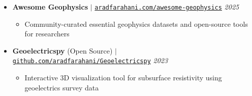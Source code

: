 \documentclass[letterpaper,11pt]{article}
\begin{document}
	\begin{itemize}[left=0pt, label={}, topsep=7.5pt, partopsep=0pt, itemsep=6pt, parsep=0pt]
		\item \textbf{Awesome Geophysics} $|$ \normalfont\href{https://aradfarahani.com/awesome-geophysics/}{\texttt{aradfarahani.com/awesome-geophysics}} \hfill \textit{2025}
		\begin{itemize}[left=15pt, label=\textbullet, topsep=4pt, partopsep=0pt, itemsep=3pt, parsep=0pt]
			\item Community-curated essential geophysics datasets and open-source tools for researchers
		\end{itemize}
	\end{itemize}
	
	\begin{itemize}[left=0pt, label={}, topsep=7.5pt, partopsep=0pt, itemsep=6pt, parsep=0pt]
		\item \textbf{Geoelectricspy} (Open Source) $|$ \normalfont\href{https://github.com/aradfarahani/Geoelectricspy/}{\texttt{github.com/aradfarahani/Geoelectricspy}} \hfill \textit{2023}
		\begin{itemize}[left=15pt, label=\textbullet, topsep=4pt, partopsep=0pt, itemsep=3pt, parsep=0pt]
			\item Interactive 3D visualization tool for subsurface resistivity using geoelectrics survey data
		\end{itemize}
	\end{itemize}
	
\end{document}
